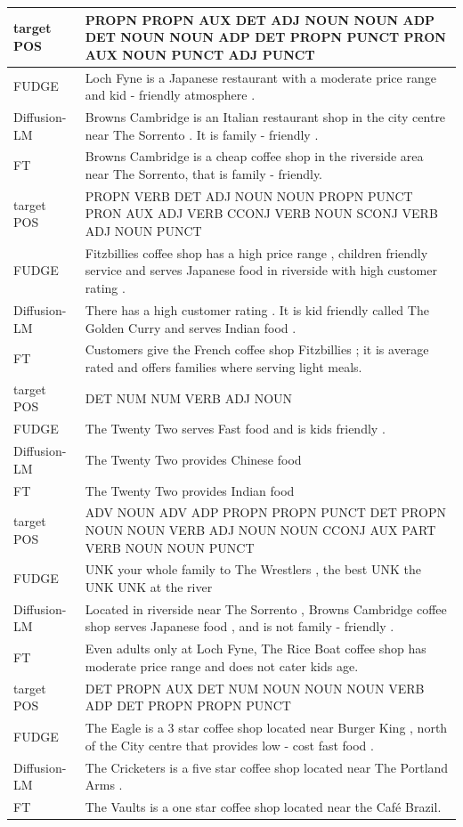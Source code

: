 \documentclass{article}
\begin{document}
\begin{table}
{\begin{tabular}{lp{13cm}}
\\
\toprule
target POS &  PROPN PROPN AUX DET ADJ NOUN NOUN ADP DET NOUN NOUN ADP DET PROPN PUNCT PRON AUX NOUN PUNCT ADJ PUNCT\\
\midrule
FUDGE &  Loch Fyne is a Japanese restaurant with a moderate price range and kid - friendly atmosphere . \\
Diffusion-LM &   Browns Cambridge is an Italian restaurant shop in the city centre near The Sorrento . It is family - friendly . \\
FT &  Browns Cambridge is a cheap coffee shop in the riverside area near The Sorrento, that is family - friendly. 
\\
\toprule
target POS &  PROPN VERB DET ADJ NOUN NOUN PROPN PUNCT PRON AUX ADJ VERB CCONJ VERB NOUN SCONJ VERB ADJ NOUN PUNCT\\
\midrule
FUDGE &  Fitzbillies coffee shop has a high price range , children friendly service and serves Japanese food in riverside with high customer rating . \\
Diffusion-LM &   There has a high customer rating . It is kid friendly called The Golden Curry and serves Indian food . \\
FT &  Customers give the French coffee shop Fitzbillies ; it is average rated and offers families where serving light meals. 
\\
\toprule
target POS &  DET NUM NUM VERB ADJ NOUN\\
\midrule
FUDGE &  The Twenty Two serves Fast food and is kids friendly . \\
Diffusion-LM &  The Twenty Two provides Chinese food \\
FT &  The Twenty Two provides Indian food 
\\
\toprule
target POS &  ADV NOUN ADV ADP PROPN PROPN PUNCT DET PROPN NOUN NOUN VERB ADJ NOUN NOUN CCONJ AUX PART VERB NOUN NOUN PUNCT\\
\midrule
FUDGE &  UNK your whole family to The Wrestlers , the best UNK the UNK UNK at the river \\
Diffusion-LM &   Located in riverside near The Sorrento , Browns Cambridge coffee shop serves Japanese food , and is not family - friendly . \\
FT &  Even adults only at Loch Fyne, The Rice Boat coffee shop has moderate price range and does not cater kids age. 
\\
\toprule
target POS &  DET PROPN AUX DET NUM NOUN NOUN NOUN VERB ADP DET PROPN PROPN PUNCT\\
\midrule
FUDGE &  The Eagle is a 3 star coffee shop located near Burger King , north of the City centre that provides low - cost fast food . \\
Diffusion-LM &   The Cricketers is a five star coffee shop located near The Portland Arms . \\
FT &  The Vaults is a one star coffee shop located near the Café Brazil. 
\\


\end{tabular}}
\end{table}
\end{document}
